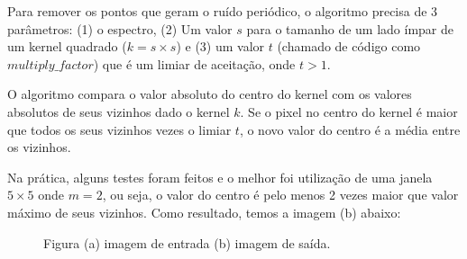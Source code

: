 \documentclass{article}
\begin{document}
	Para remover os pontos que geram o ruído periódico, o algoritmo precisa de 3 parâmetros: (1) o espectro, (2) Um valor $s$ para o tamanho de um lado ímpar de um kernel quadrado ($k = s\times s$) e (3) um valor $t$ (chamado de código como $multiply\_factor$) que é um limiar de aceitação, onde $t > 1$.
	
	O algoritmo compara o valor absoluto do centro do kernel com os valores absolutos de seus vizinhos dado o kernel $k$. Se o pixel no centro do kernel é maior que todos os seus vizinhos vezes o limiar $t$, o novo valor do centro é a média entre os vizinhos.
	
	Na prática, alguns testes foram feitos e o melhor foi utilização de uma janela $5 \times 5$ onde $m=2$, ou seja, o valor do centro é pelo menos 2 vezes maior que valor máximo de seus vizinhos. Como resultado, temos a imagem (b) abaixo:
	
	\begin{figure}[H]
		\centering
		\qquad
		\caption{Figura (a) imagem de entrada (b) imagem de saída.} 
		
	\end{figure}
	
\end{document}
